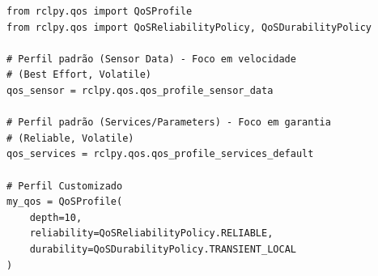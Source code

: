 \documentclass[preview,border=2pt]{standalone}
\begin{document}
\begin{lstlisting}[style=pythonstyle]
from rclpy.qos import QoSProfile
from rclpy.qos import QoSReliabilityPolicy, QoSDurabilityPolicy

# Perfil padrão (Sensor Data) - Foco em velocidade
# (Best Effort, Volatile)
qos_sensor = rclpy.qos.qos_profile_sensor_data

# Perfil padrão (Services/Parameters) - Foco em garantia
# (Reliable, Volatile)
qos_services = rclpy.qos.qos_profile_services_default

# Perfil Customizado
my_qos = QoSProfile(
    depth=10,
    reliability=QoSReliabilityPolicy.RELIABLE,
    durability=QoSDurabilityPolicy.TRANSIENT_LOCAL
)
\end{lstlisting}
\end{document}
